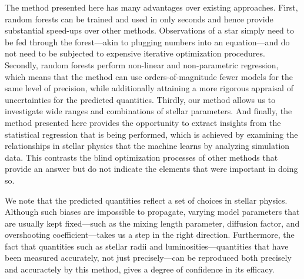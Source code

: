 \documentclass[twocolumn,twocolappendix]{aastex6}
\begin{document}
The method presented here has many advantages over existing approaches. First, random forests can be trained and used in only seconds and hence provide substantial speed-ups over other methods. Observations of a star simply need to be fed through the forest---akin to plugging numbers into an equation---and do not need to be subjected to expensive iterative optimization procedures. 
Secondly, random forests perform non-linear and non-parametric regression, which means that the method can use orders-of-magnitude fewer models for the same level of precision, while additionally attaining a more rigorous appraisal of uncertainties for the predicted quantities. 
Thirdly, our method allows us to investigate wide ranges and combinations of stellar parameters. %
And finally, the method presented here provides the opportunity to extract insights from the statistical regression that is being performed, which is achieved by examining the relationships in stellar physics that the machine learns by analyzing simulation data. This contrasts the blind optimization processes of other methods that provide an answer but do not indicate the elements that were important in doing so. 

We note that the predicted quantities reflect a set of choices in stellar physics. Although such biases are impossible to propagate, varying model parameters that are usually kept fixed---such as the mixing length parameter, diffusion factor, and overshooting coefficient---takes us a step in the right direction. Furthermore, the fact that quantities such as stellar radii and luminosities---quantities that have been measured accurately, not just precisely---can be reproduced both precisely and accuractely by this method, gives a degree of confidence in its efficacy. 
\end{document}
